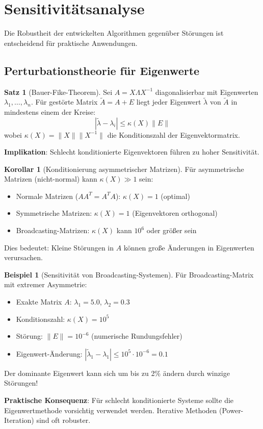 ﻿\documentclass[a4paper,12pt]{report}
\theoremstyle{definition}
\newtheorem{beispiel}{Beispiel}
\newtheorem{satz}{Satz}
\newtheorem{korollar}{Korollar}
\begin{document}
	\section{Sensitivitätsanalyse}
	
	Die Robustheit der entwickelten Algorithmen gegenüber Störungen ist entscheidend für praktische Anwendungen.
	
	\subsection{Perturbationstheorie für Eigenwerte}
	
	\begin{satz}[Bauer-Fike-Theorem]
		Sei $A = X \Lambda X^{-1}$ diagonalisierbar mit Eigenwerten $\lambda_1, \ldots, \lambda_n$. Für gestörte Matrix $\tilde{A} = A + E$ liegt jeder Eigenwert $\tilde{\lambda}$ von $\tilde{A}$ in mindestens einem der Kreise:
		\[
		|\tilde{\lambda} - \lambda_i| \leq \kappa(X) \|E\|
		\]
		wobei $\kappa(X) = \|X\| \|X^{-1}\|$ die Konditionszahl der Eigenvektormatrix.
		
		\textbf{Implikation}: Schlecht konditionierte Eigenvektoren führen zu hoher Sensitivität.
	\end{satz}
	
	\begin{korollar}[Konditionierung asymmetrischer Matrizen]
		Für asymmetrische Matrizen (nicht-normal) kann $\kappa(X) \gg 1$ sein:
		\begin{itemize}
			\item Normale Matrizen ($AA^T = A^T A$): $\kappa(X) = 1$ (optimal)
			\item Symmetrische Matrizen: $\kappa(X) = 1$ (Eigenvektoren orthogonal)
			\item Broadcasting-Matrizen: $\kappa(X)$ kann $10^6$ oder größer sein
		\end{itemize}
		
		Dies bedeutet: Kleine Störungen in $A$ können große Änderungen in Eigenwerten verursachen.
	\end{korollar}
	
	\begin{beispiel}[Sensitivität von Broadcasting-Systemen]
		Für Broadcasting-Matrix mit extremer Asymmetrie:
		\begin{itemize}
			\item Exakte Matrix $A$: $\lambda_1 = 5.0$, $\lambda_2 = 0.3$
			\item Konditionszahl: $\kappa(X) = 10^5$
			\item Störung: $\|E\| = 10^{-6}$ (numerische Rundungsfehler)
			\item Eigenwert-Änderung: $|\tilde{\lambda}_1 - \lambda_1| \leq 10^5 \cdot 10^{-6} = 0.1$
		\end{itemize}
		
		Der dominante Eigenwert kann sich um bis zu 2\% ändern durch winzige Störungen!
		
		\textbf{Praktische Konsequenz}: Für schlecht konditionierte Systeme sollte die Eigenwertmethode vorsichtig verwendet werden. Iterative Methoden (Power-Iteration) sind oft robuster.
	\end{beispiel}
	
\end{document}
